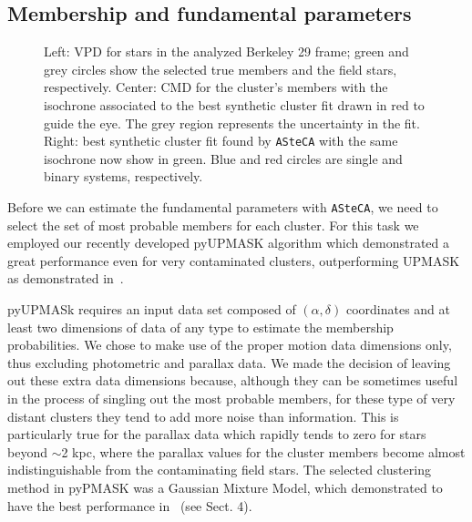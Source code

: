 \documentclass[draft]{aa}
\begin{document}
 \subsection{Membership and fundamental parameters}
  \label{ssec:fund_pars}

  \begin{figure}
   \caption{Left: VPD for stars in the analyzed Berkeley 29
    frame; green and grey circles show the selected true members and the field
    stars, respectively.
    Center: CMD for the cluster's members with the isochrone associated to the
    best synthetic cluster fit drawn in red to guide the eye. The grey region
    represents the uncertainty in the fit.
    Right: best synthetic cluster fit found by \texttt{ASteCA} with the same
    isochrone now show in green. Blue and red circles are single and binary
    systems, respectively.}
   \label{fig:BER29_fpars}
  \end{figure}

  Before we can estimate the fundamental parameters with \texttt{ASteCA}, we
  need to select the set of most probable members for each cluster. For this
  task we employed our recently developed pyUPMASK algorithm which demonstrated
  a great performance even for very contaminated clusters, outperforming
  UPMASK~\citep{Krone2014} as demonstrated in~\cite{Pera_2021}.

  pyUPMASk requires an input data set composed of $(\alpha, \delta)$ coordinates
  and at least two dimensions of data of any type to estimate the membership
  probabilities. We chose to make use of the proper motion data dimensions only,
  thus excluding photometric and parallax data.
  We made the decision of leaving out these extra data dimensions because,
  although they can be sometimes useful in the process of singling out the most
  probable members, for these type of very distant clusters they tend to add
  more noise than information.
  This is particularly true for the parallax data which
  rapidly tends to zero for stars beyond $\sim$2 kpc, where the parallax values
  for the cluster members become almost indistinguishable from the contaminating
  field stars. The selected clustering method in pyPMASK was a Gaussian Mixture
  Model, which demonstrated to have the best performance in~\cite{Pera_2021} 
  (see Sect. 4).
\end{document}
